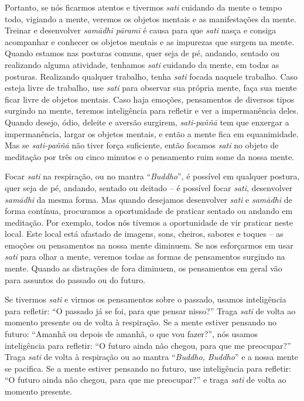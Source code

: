 Portanto, se nós ficarmos atentos e tivermos \textit{sati} cuidando
da mente o tempo todo, vigiando a mente, veremos os objetos mentais e
as manifestações da mente. Treinar e desenvolver \textit{samādhi
pāramī} é causa para que \textit{sati} nasça e consiga acompanhar
e conhecer os objetos mentais e as impurezas que surgem na mente.
Quando estamos nas posturas comuns, quer seja de pé, andando, sentado
ou realizando alguma atividade, tenhamos \textit{sati} cuidando da
mente, em todas as posturas. Realizando qualquer trabalho, tenha
\textit{sati} focada naquele trabalho. Caso esteja livre de trabalho,
use \textit{sati} para observar sua própria mente, faça sua mente ficar
livre de objetos mentais. Caso haja emoções, pensamentos de diversos
tipos surgindo na mente, teremos inteligência para refletir e ver a
impermanência deles. Quando desejo, ódio, deleite e aversão surgirem,
\textit{sati-paññā} tem que enxergar a impermanência, largar os
objetos mentais, e então a mente fica em equanimidade. Mas se
\textit{sati-paññā} não tiver força suficiente, então focamos
\textit{sati} no objeto de meditação por três ou cinco minutos e o
pensamento ruim some da nossa mente.

Focar \textit{sati} na respiração, ou no mantra “\textit{Buddho}”, é
possível em qualquer postura, quer seja de pé, andando, sentado ou
deitado – é possível focar \textit{sati}, desenvolver
\textit{samādhi} da mesma forma. Mas quando desejamos desenvolver
\textit{sati} e \textit{samādhi} de forma contínua, procuramos a
oportunidade de praticar sentado ou andando em meditação. Por exemplo,
todos nós tivemos a oportunidade de vir praticar neste local. Este
local está afastado de imagens, sons, cheiros, sabores e toques – as
emoções ou pensamentos na nossa mente diminuem. Se nos esforçarmos em
usar \textit{sati} para olhar a mente, veremos todas as formas de
pensamentos surgindo na mente. Quando as distrações de fora diminuem,
os pensamentos em geral vão para assuntos do passado ou do futuro.

Se tivermos \textit{sati} e virmos os pensamentos sobre o passado,
usamos inteligência para refletir: “O passado já se foi, para que
pensar nisso?” Traga \textit{sati} de volta ao momento presente ou de
volta à respiração. Se a mente estiver pensando no futuro: “Amanhã ou
depois de amanhã, o que vou fazer?”, nós usamos inteligência para
refletir: “O futuro ainda não chegou, para que me preocupar?” Traga
\textit{sati} de volta à respiração ou ao mantra “\textit{Buddho,
Buddho}” e a nossa mente se pacifica. Se a mente estiver pensando no
futuro, use inteligência para refletir: “O futuro ainda não chegou,
para que me preocupar?” e traga \textit{sati} de volta ao momento
presente.

